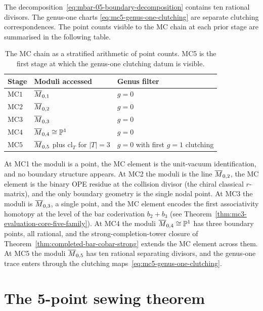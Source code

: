 The decomposition~\eqref{eq:mbar-05-boundary-decomposition} contains ten
rational divisors. The genus-one charts
\eqref{eq:mc5-genus-one-clutching} are separate clutching
correspondences. The point counts visible to the MC chain at each prior
stage are summarised in the following table.

\begin{table}[t]
\centering
\begin{tabular}{l@{\quad}l@{\quad}l}
\toprule
Stage & Moduli accessed & Genus filter \\
\midrule
$\mathrm{MC1}$ & $\overline{M}_{0,1}$ & $g = 0$ \\
$\mathrm{MC2}$ & $\overline{M}_{0,2}$ & $g = 0$ \\
$\mathrm{MC3}$ & $\overline{M}_{0,3}$ & $g = 0$ \\
$\mathrm{MC4}$ & $\overline{M}_{0,4} \cong \mathbb{P}^{1}$ & $g = 0$ \\
$\mathrm{MC5}$ & $\overline{M}_{0,5}$ plus $\mathrm{cl}_{T}$ for $|T|=3$ & $g = 0$ with first $g=1$ clutching \\
\bottomrule
\end{tabular}
\caption{The MC chain as a stratified arithmetic of point counts. MC5
is the first stage at which the genus-one clutching datum is visible.}
\label{tab:mc-chain-genus-filter-g0g1-wall}
\end{table}

\begin{remark}
\label{rem:mc5-arithmetic-g0g1-wall}
At MC1 the moduli is a point, the MC element is the unit-vacuum
identification, and no boundary structure appears. At MC2 the moduli is
the line $\overline{M}_{0,2}$, the MC element is the binary OPE residue at the
collision divisor (the chiral classical $r$-matrix), and the only
boundary geometry is the single nodal point. At MC3 the moduli is
$\overline{M}_{0,3}$, a single point, and the MC element encodes the first
associativity homotopy at the level of the bar coderivation $b_{2}+b_{3}$
\textup{(}see Theorem~\ref{thm:mc3-evaluation-core-five-family}\textup{)}. At MC4 the
moduli $\overline{M}_{0,4} \cong \mathbb{P}^{1}$ has three boundary points, all
rational, and the strong-completion-tower closure of
Theorem~\ref{thm:completed-bar-cobar-strong} extends the MC element
across them. At MC5 the moduli $\overline{M}_{0,5}$ has ten rational
separating divisors, and the genus-one trace enters through the
clutching maps~\eqref{eq:mc5-genus-one-clutching}.
\end{remark}

\section{The 5-point sewing theorem}
\label{sec:mc5-statement-g0g1-wall}

